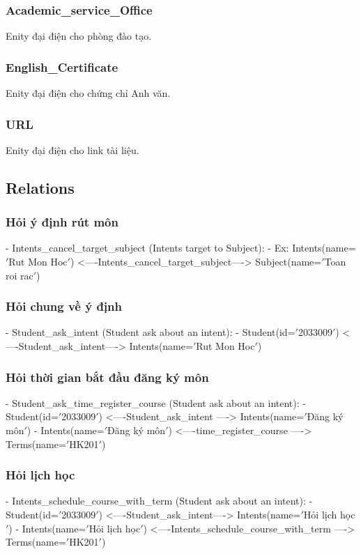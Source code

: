 \subsubsection{Academic\_service\_Office}
Enity đại điện cho phòng đào tạo.
\subsubsection{English\_Certificate}
Enity đại điện cho chứng chỉ Anh văn.
\subsubsection{URL}
Enity đại điện cho link tài liệu.


\subsection{Relations}\label{subsec:relations}
            \subsubsection{Hỏi ý định rút môn}
            - Intents\_cancel\_target\_subject (Intents target to Subject):
                - Ex: Intents(name=\('\)Rut Mon Hoc\('\)) <----Intents\_cancel\_target\_subject----> Subject(name=\('\)Toan roi rac\('\))

            \subsubsection{Hỏi chung về ý định}
            - Student\_ask\_intent (Student ask about an intent):
                - Student(id=\('\)2033009\('\)) <----Student\_ask\_intent----> Intents(name=\('\)Rut Mon Hoc\('\))

            \subsubsection{Hỏi thời gian bắt đầu đăng ký môn}
            - Student\_ask\_time\_register\_course (Student ask about an intent):
                - Student(id=\('\)2033009\('\)) <----Student\_ask\_intent ----> Intents(name=\('\)Đăng ký môn\('\))
                - Intents(name=\('\)Đăng ký môn\('\)) <----time\_register\_course ----> Terms(name=\('\)HK201\('\))

            \subsubsection{Hỏi lịch học}
            - Intents\_schedule\_course\_with\_term (Student ask about an intent):
                - Student(id=\('\)2033009\('\)) <----Student\_ask\_intent----> Intents(name=\('\)Hỏi lịch học\('\))
                - Intents(name=\('\)Hỏi lịch học\('\)) <----Intents\_schedule\_course\_with\_term ----> Terms(name=\('\)HK201\('\))

